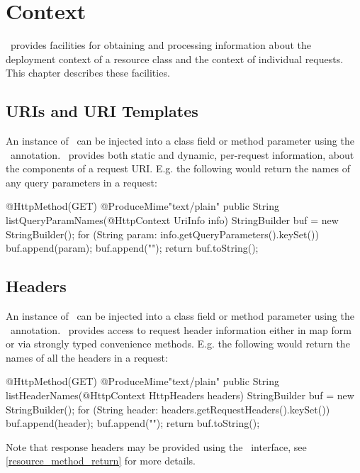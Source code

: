 \chapter{Context}
\label{context}

\jaxrs\ provides facilities for obtaining and processing information about the deployment context of a resource class and the context of individual requests. This chapter describes these facilities.

\section{URIs and URI Templates}

An instance of \UriInfo\ can be injected into a class field or method parameter using the \HttpContext\ annotation. \UriInfo\ provides both static and dynamic, per-request information, about the components of a request URI. E.g. the following would return the names of any query parameters in a request:

\begin{listing}{1}
@HttpMethod(GET)
@ProduceMime{"text/plain"}
public String listQueryParamNames(@HttpContext UriInfo info) {
  StringBuilder buf = new StringBuilder();
  for (String param: info.getQueryParameters().keySet()) {
    buf.append(param);
    buf.append("\n");
  }
  return buf.toString();
}
\end{listing} 

\section{Headers}

An instance of \HttpHeaders\ can be injected into a class field or method parameter using the \HttpContext\ annotation. \HttpHeaders\ provides access to request header information either in map form or via strongly typed convenience methods. E.g. the following would return the names of all the headers in a request:

\begin{listing}{1}
@HttpMethod(GET)
@ProduceMime{"text/plain"}
public String listHeaderNames(@HttpContext HttpHeaders headers) {
  StringBuilder buf = new StringBuilder();
  for (String header: headers.getRequestHeaders().keySet()) {
    buf.append(header);
    buf.append("\n");
  }
  return buf.toString();
}
\end{listing}

Note that response headers may be provided using the \Response\ interface, see \ref{resource_method_return} for more details.

